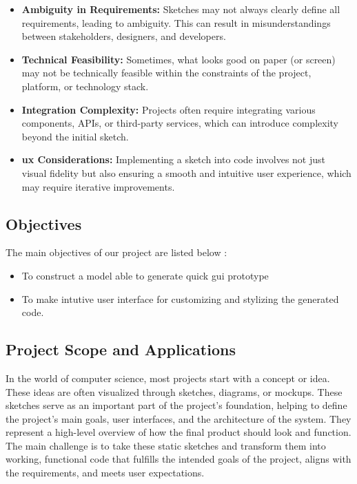 \begin{itemize}
    \item \textbf{Ambiguity in Requirements:} Sketches may not always clearly define all
    requirements, leading to ambiguity. This can result in misunderstandings
    between stakeholders, designers, and developers.
    \item \textbf{Technical Feasibility:} Sometimes, what looks good on paper (or screen) may
    not be technically feasible within the constraints of the project, platform, or
    technology stack. 
    \item \textbf{Integration Complexity:} Projects often require integrating various
    components, APIs, or third-party services, which can introduce complexity
    beyond the initial sketch.
    \item \textbf{\gls{ux} Considerations:} Implementing a sketch into code
    involves not just visual fidelity but also ensuring a smooth and intuitive user
    experience, which may require iterative improvements.
\end{itemize}
    \subsection{Objectives}
    The main objectives of our project are listed below :
    \begin{itemize}
        \item To construct a model able to generate quick \gls{gui} prototype
        \item To make intutive user interface for customizing and stylizing the generated
code.
    \end{itemize}
    
    \subsection{Project Scope and Applications}
    \sloppy
    In the world of computer science, most projects start with a concept or idea. These ideas are often visualized through sketches, diagrams, or mockups. These sketches serve as an important part of the project’s foundation, helping to define the project's main goals, user interfaces, and the architecture of the system. They represent a high-level overview of how the final product should look and function. The main challenge is to take these static sketches and transform them into working, functional code that fulfills the intended goals of the project, aligns with the requirements, and meets user expectations.
    
